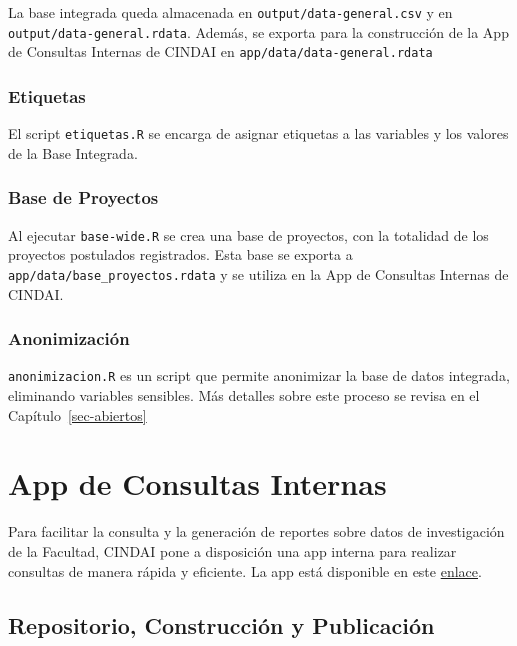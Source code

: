 \documentclass[
  spanish,
  letterpaper,
  DIV=11,
  numbers=noendperiod]{scrreprt}
\begin{document}
La base integrada queda almacenada en \texttt{output/data-general.csv} y
en \texttt{output/data-general.rdata}. Además, se exporta para la
construcción de la App de Consultas Internas de CINDAI en
\texttt{app/data/data-general.rdata}

\subsection{Etiquetas}\label{etiquetas}

El script \texttt{etiquetas.R} se encarga de asignar etiquetas a las
variables y los valores de la Base Integrada.

\subsection{Base de Proyectos}\label{base-de-proyectos}

Al ejecutar \texttt{base-wide.R} se crea una base de proyectos, con la
totalidad de los proyectos postulados registrados. Esta base se exporta
a \texttt{app/data/base\_proyectos.rdata} y se utiliza en la App de
Consultas Internas de CINDAI.

\subsection{Anonimización}\label{anonimizaciuxf3n}

\texttt{anonimizacion.R} es un script que permite anonimizar la base de
datos integrada, eliminando variables sensibles. Más detalles sobre este
proceso se revisa en el Capítulo~\ref{sec-abiertos}


\chapter{App de Consultas Internas}\label{sec-consultas}

Para facilitar la consulta y la generación de reportes sobre datos de
investigación de la Facultad, CINDAI pone a disposición una app interna
para realizar consultas de manera rápida y eficiente. La app está
disponible en este
\href{https://dip-facso.shinyapps.io/consultas/\#consulta-proyectos}{enlace}.

\section{Repositorio, Construcción y
Publicación}\label{repositorio-construcciuxf3n-y-publicaciuxf3n}
\end{document}
